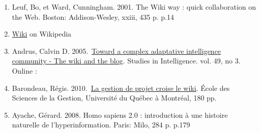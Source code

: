 \begin{enumerate}
\itemsep1pt\parskip0pt
\item
  Leuf, Bo, et Ward, Cunningham. 2001. The Wiki way : quick
  collaboration on the Web. Boston: Addison-Wesley, xxiii, 435 p. p.14
\item
  \href{http://en.wikipedia.org/wiki/Wiki}{Wiki} on Wikipedia
\item
  Andrus, Calvin D. 2005.~\href{http://ssrn.com/abstract=755904}{Toward
  a complex adaptative intelligence community - The wiki and the blog}.
  Studies in Intelligence. vol. 49, no 3. Online :
\item
  Barondeau, Régis.
  2010.~\href{http://www.regisbarondeau.com/Chapitre+4\%3A+Analyse+du+cas\#Synth_se}{La
  gestion de projet croise le wiki}. École des Sciences de la Gestion,
  Université du Québec à Montréal, 180 pp.
\item
  Ayache, Gérard. 2008. Homo sapiens 2.0 : introduction à une histoire
  naturelle de l'hyperinformation. Paris: Milo, 284 p. p.179
\end{enumerate}

